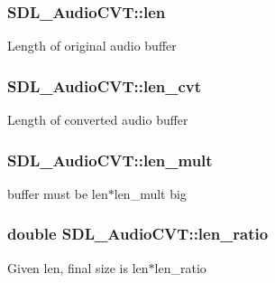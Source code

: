 \subsubsection[{len}]{ S\+D\+L\+\_\+\+Audio\+C\+V\+T\+::len}\label{struct_s_d_l___audio_c_v_t_aeaeb8c5a63c3ab96471fbfdf412c78ff}
Length of original audio buffer \hypertarget{struct_s_d_l___audio_c_v_t_a5c60163f34d1947e5b166c23aba9879d}{}
\subsubsection[{len\+\_\+cvt}]{ S\+D\+L\+\_\+\+Audio\+C\+V\+T\+::len\+\_\+cvt}\label{struct_s_d_l___audio_c_v_t_a5c60163f34d1947e5b166c23aba9879d}
Length of converted audio buffer \hypertarget{struct_s_d_l___audio_c_v_t_ac9662d47cf2348b82b27b151150116b0}{}
\subsubsection[{len\+\_\+mult}]{ S\+D\+L\+\_\+\+Audio\+C\+V\+T\+::len\+\_\+mult}\label{struct_s_d_l___audio_c_v_t_ac9662d47cf2348b82b27b151150116b0}
buffer must be len$\ast$len\+\_\+mult big \hypertarget{struct_s_d_l___audio_c_v_t_a5628ff5ccf711de9d77c0a4a9f57d2f0}{}
\subsubsection[{len\+\_\+ratio}]{\setlength{\rightskip}{0pt plus 5cm}double S\+D\+L\+\_\+\+Audio\+C\+V\+T\+::len\+\_\+ratio}\label{struct_s_d_l___audio_c_v_t_a5628ff5ccf711de9d77c0a4a9f57d2f0}
Given len, final size is len$\ast$len\+\_\+ratio \hypertarget{struct_s_d_l___audio_c_v_t_ac600a035a48df05e14d3712fd6953ad4}{}
